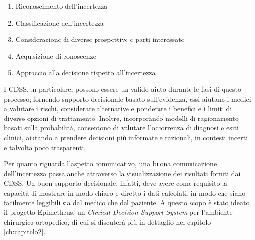 \begin{enumerate}
    \item Riconoscimento dell'incertezza
    \item Classificazione dell'incertezza
    \item Considerazione di diverse prospettive e parti interessate
    \item Acquisizione di conoscenze
    \item Approccio alla decisione rispetto all'incertezza
\end{enumerate}

I CDSS, in particolare, possono essere un valido aiuto durante le fasi di questo processo; fornendo supporto decisionale basato sull'evidenza, essi aiutano i medici a valutare i rischi, considerare alternative e ponderare i benefici e i limiti di diverse opzioni di trattamento. 
\newline
Inoltre, incorporando modelli di ragionamento basati sulla probabilità, consentono di valutare l’occorrenza di diagnosi o esiti clinici, aiutando a prendere decisioni più informate e razionali, in contesti incerti e talvolta poco trasparenti.

Per quanto riguarda l’aspetto comunicativo, una buona comunicazione dell'incertezza passa anche attraverso la visualizzazione dei risultati forniti dai CDSS. Un buon supporto decisionale, infatti, deve avere come requisito la capacità di mostrare in modo chiaro e diretto i dati calcolati, in modo che siano facilmente leggibili sia dal medico che dal paziente.
\newline
A questo scopo è stato ideato il progetto Epimetheus, un \textit{Clinical Decision Support System} per l’ambiente chirurgico-ortopedico, di cui si discuterà più in dettaglio nel capitolo \ref{ch:capitolo2}.

